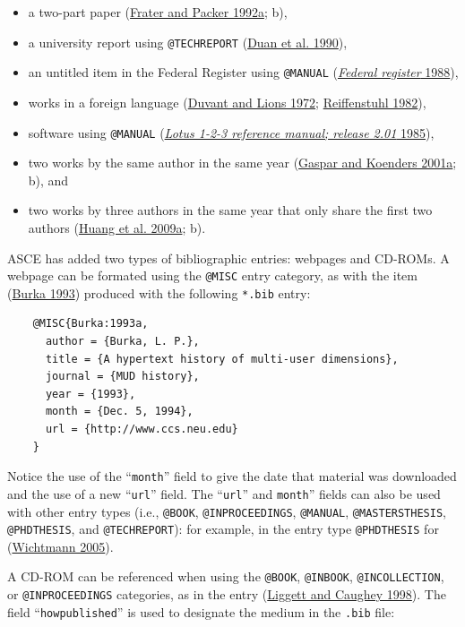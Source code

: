 \documentclass[
  NewProceedings,
  letterpaper]{./assets/ascelike-new}
\begin{document}
\begin{itemize}
\item
  a two-part paper (\protect\hyperlink{ref-Frater:1992a}{Frater and
  Packer 1992a}; b),
\item
  a university report using \texttt{@TECHREPORT}
  (\protect\hyperlink{ref-Duan:1990a}{Duan et al. 1990}),
\item
  an untitled item in the Federal Register using \texttt{@MANUAL}
  (\protect\hyperlink{ref-FR:1968a}{\emph{Federal register} 1988}),
\item
  works in a foreign language
  (\protect\hyperlink{ref-Duvant:1972a}{Duvant and Lions 1972};
  \protect\hyperlink{ref-Reiffenstuhl:1982a}{Reiffenstuhl 1982}),
\item
  software using \texttt{@MANUAL}
  (\protect\hyperlink{ref-Lotus:1985a}{\emph{Lotus 1-2-3 reference
  manual; release 2.01} 1985}),
\item
  two works by the same author in the same year
  (\protect\hyperlink{ref-Gaspar:2001b}{Gaspar and Koenders 2001a}; b),
  and
\item
  two works by three authors in the same year that only share the first
  two authors (\protect\hyperlink{ref-Huang2009a}{Huang et al. 2009a};
  b).
\end{itemize}

ASCE has added two types of bibliographic entries: webpages and CD-ROMs.
A webpage can be formated using the \texttt{@MISC} entry category, as
with the item (\protect\hyperlink{ref-Burka:1993a}{Burka 1993}) produced
with the following \texttt{*.bib} entry:

\begin{verbatim}
    @MISC{Burka:1993a,
      author = {Burka, L. P.},
      title = {A hypertext history of multi-user dimensions},
      journal = {MUD history},
      year = {1993},
      month = {Dec. 5, 1994},
      url = {http://www.ccs.neu.edu}
    }
\end{verbatim}

Notice the use of the ``\texttt{month}'' field to give the date that
material was downloaded and the use of a new ``\texttt{url}'' field. The
``\texttt{url}'' and \texttt{month}'' fields can also be used with other
entry types (i.e., \texttt{@BOOK}, \texttt{@INPROCEEDINGS},
\texttt{@MANUAL}, \texttt{@MASTERSTHESIS}, \texttt{@PHDTHESIS}, and
\texttt{@TECHREPORT}): for example, in the entry type
\texttt{@PHDTHESIS} for
(\protect\hyperlink{ref-Wichtmann:2005a}{Wichtmann 2005}).

A CD-ROM can be referenced when using the \texttt{@BOOK},
\texttt{@INBOOK}, \texttt{@INCOLLECTION}, or \texttt{@INPROCEEDINGS}
categories, as in the entry
(\protect\hyperlink{ref-Liggett:1998a}{Liggett and Caughey 1998}). The
field ``\texttt{howpublished}'' is used to designate the medium in the
\texttt{.bib} file:
\end{document}
